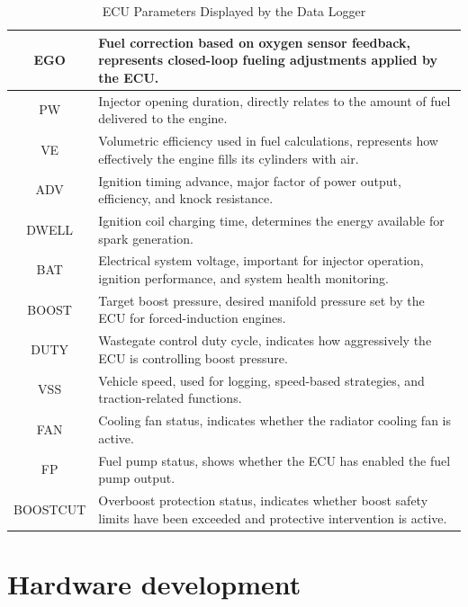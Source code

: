 \begin{table}[H]
\begin{tabular}{|c|p{12cm}|}
EGO & Fuel correction based on oxygen sensor feedback, represents closed-loop fueling adjustments applied by the ECU. \\
\hline

PW & Injector opening duration, directly relates to the amount of fuel delivered to the engine. \\
\hline

VE & Volumetric efficiency used in fuel calculations, represents how effectively the engine fills its cylinders with air. \\
\hline

ADV & Ignition timing advance, major factor of power output, efficiency, and knock resistance. \\
\hline

DWELL & Ignition coil charging time, determines the energy available for spark generation. \\
\hline

BAT & Electrical system voltage, important for injector operation, ignition performance, and system health monitoring. \\
\hline

BOOST & Target boost pressure, desired manifold pressure set by the ECU for forced-induction engines. \\
\hline

DUTY & Wastegate control duty cycle, indicates how aggressively the ECU is controlling boost pressure. \\
\hline

VSS & Vehicle speed, used for logging, speed-based strategies, and traction-related functions. \\
\hline

FAN & Cooling fan status, indicates whether the radiator cooling fan is active. \\
\hline

FP & Fuel pump status, shows whether the ECU has enabled the fuel pump output. \\
\hline

BOOSTCUT & Overboost protection status, indicates whether boost safety limits have been exceeded and protective intervention is active. \\
\hline

\end{tabular}
\caption{ECU Parameters Displayed by the Data Logger}
\label{tab:ecu_parameters}
\end{table}

\section{Hardware development}
